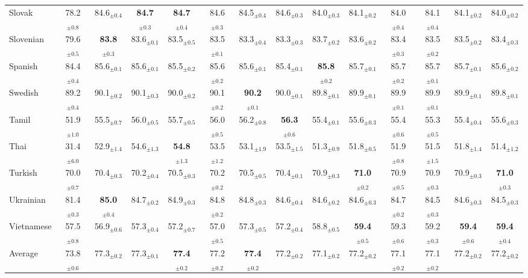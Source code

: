 \begin{table*}[ht]
{\begin{tabular}{lccccccccccccc}
Slovak & 78.2$_{\pm 0.8}$ & 84.6$_{\pm 0.4}$ & \textbf{84.7}$_{\pm 0.3}$ & \textbf{84.7}$_{\pm 0.4}$ & 84.6$_{\pm 0.3}$ & 84.5$_{\pm 0.4}$ & 84.6$_{\pm 0.3}$ & 84.0$_{\pm 0.3}$ & 84.1$_{\pm 0.2}$ & 84.0$_{\pm 0.4}$ & 84.1$_{\pm 0.4}$ & 84.1$_{\pm 0.2}$ & 84.0$_{\pm 0.2}$ \\
Slovenian & 79.6$_{\pm 0.5}$ & \textbf{83.8}$_{\pm 0.3}$ & 83.6$_{\pm 0.1}$ & 83.5$_{\pm 0.5}$ & 83.5$_{\pm 0.1}$ & 83.3$_{\pm 0.4}$ & 83.3$_{\pm 0.3}$ & 83.7$_{\pm 0.2}$ & 83.6$_{\pm 0.2}$ & 83.4$_{\pm 0.3}$ & 83.5$_{\pm 0.2}$ & 83.5$_{\pm 0.2}$ & 83.4$_{\pm 0.3}$ \\
Spanish & 84.4$_{\pm 0.4}$ & 85.6$_{\pm 0.1}$ & 85.6$_{\pm 0.1}$ & 85.5$_{\pm 0.2}$ & 85.6$_{\pm 0.2}$ & 85.6$_{\pm 0.1}$ & 85.4$_{\pm 0.1}$ & \textbf{85.8}$_{\pm 0.2}$ & 85.7$_{\pm 0.1}$ & 85.7$_{\pm 0.2}$ & 85.7$_{\pm 0.1}$ & 85.7$_{\pm 0.1}$ & 85.6$_{\pm 0.2}$ \\
Swedish & 89.2$_{\pm 0.4}$ & 90.1$_{\pm 0.2}$ & 90.1$_{\pm 0.3}$ & 90.0$_{\pm 0.2}$ & 90.1$_{\pm 0.2}$ & \textbf{90.2}$_{\pm 0.1}$ & 90.0$_{\pm 0.1}$ & 89.8$_{\pm 0.1}$ & 89.9$_{\pm 0.1}$ & 89.9$_{\pm 0.1}$ & 89.9$_{\pm 0.1}$ & 89.9$_{\pm 0.1}$ & 89.8$_{\pm 0.1}$ \\
Tamil & 51.9$_{\pm 1.0}$ & 55.5$_{\pm 0.7}$ & 56.0$_{\pm 0.5}$ & 55.7$_{\pm 0.5}$ & 56.0$_{\pm 0.5}$ & 56.2$_{\pm 0.8}$ & \textbf{56.3}$_{\pm 0.6}$ & 55.4$_{\pm 0.1}$ & 55.6$_{\pm 0.3}$ & 55.4$_{\pm 0.6}$ & 55.3$_{\pm 0.5}$ & 55.4$_{\pm 0.4}$ & 55.6$_{\pm 0.3}$ \\
Thai & 31.4$_{\pm 6.0}$ & 52.9$_{\pm 1.4}$ & 54.6$_{\pm 1.3}$ & \textbf{54.8}$_{\pm 1.3}$ & 53.5$_{\pm 1.2}$ & 53.1$_{\pm 1.9}$ & 53.5$_{\pm 1.5}$ & 51.3$_{\pm 0.9}$ & 51.8$_{\pm 0.5}$ & 51.9$_{\pm 0.8}$ & 51.5$_{\pm 1.5}$ & 51.8$_{\pm 1.4}$ & 51.4$_{\pm 1.2}$ \\
Turkish & 70.0$_{\pm 0.7}$ & 70.4$_{\pm 0.3}$ & 70.2$_{\pm 0.4}$ & 70.5$_{\pm 0.3}$ & 70.2$_{\pm 0.2}$ & 70.5$_{\pm 0.5}$ & 70.4$_{\pm 0.1}$ & 70.9$_{\pm 0.3}$ & \textbf{71.0}$_{\pm 0.2}$ & 70.9$_{\pm 0.5}$ & 70.9$_{\pm 0.3}$ & 70.9$_{\pm 0.3}$ & \textbf{71.0}$_{\pm 0.3}$ \\
Ukrainian & 81.4$_{\pm 0.3}$ & \textbf{85.0}$_{\pm 0.4}$ & 84.7$_{\pm 0.2}$ & 84.9$_{\pm 0.3}$ & 84.8$_{\pm 0.2}$ & 84.8$_{\pm 0.3}$ & 84.6$_{\pm 0.4}$ & 84.6$_{\pm 0.2}$ & 84.6$_{\pm 0.3}$ & 84.7$_{\pm 0.2}$ & 84.5$_{\pm 0.3}$ & 84.6$_{\pm 0.3}$ & 84.5$_{\pm 0.3}$ \\
Vietnamese & 57.5$_{\pm 0.8}$ & 56.9$_{\pm 0.6}$ & 57.3$_{\pm 0.4}$ & 57.2$_{\pm 0.7}$ & 57.0$_{\pm 0.5}$ & 57.3$_{\pm 0.5}$ & 57.2$_{\pm 0.4}$ & 58.8$_{\pm 0.5}$ & \textbf{59.4}$_{\pm 0.5}$ & 59.3$_{\pm 0.6}$ & 59.2$_{\pm 0.3}$ & \textbf{59.4}$_{\pm 0.6}$ & \textbf{59.4}$_{\pm 0.4}$ \\
\hline
Average & 73.8$_{\pm 0.6}$ & 77.3$_{\pm 0.2}$ & 77.3$_{\pm 0.1}$ & \textbf{77.4}$_{\pm 0.2}$ & 77.2$_{\pm 0.2}$ & \textbf{77.4}$_{\pm 0.2}$ & 77.2$_{\pm 0.2}$ & 77.1$_{\pm 0.2}$ & 77.2$_{\pm 0.2}$ & 77.1$_{\pm 0.2}$ & 77.1$_{\pm 0.2}$ & 77.2$_{\pm 0.2}$ & 77.2$_{\pm 0.2}$ \\


\end{tabular}}
\end{table*}
